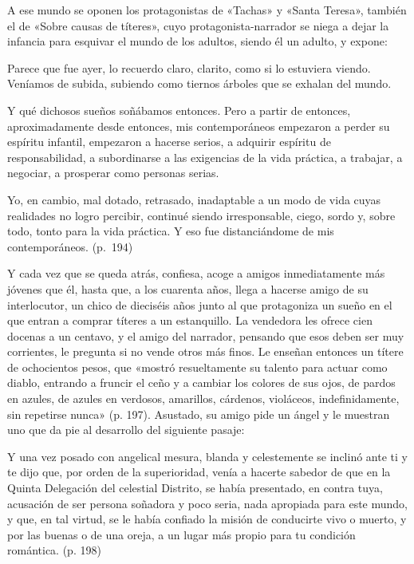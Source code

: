 \documentclass[14pt,twoside,final]{extbook} %
\begin{document}
A ese mundo se oponen los protagonistas de «Tachas» y «Santa Teresa», también el de «Sobre causas de títeres», cuyo protagonista-narrador se niega a dejar la infancia para esquivar el mundo de los adultos, siendo él un adulto, y expone:
\begin{quoting}
Parece que fue ayer, lo recuerdo claro, clarito, como si lo estuviera viendo. Veníamos de subida, subiendo como tiernos árboles que se exhalan del mundo.

Y qué dichosos sueños soñábamos entonces. Pero a partir de entonces, aproximadamente desde entonces, mis contemporáneos empezaron a perder su espíritu infantil, empezaron a hacerse serios, a adquirir espíritu de responsabilidad, a subordinarse a las exigencias de la vida práctica, a trabajar, a negociar, a prosperar como personas serias.

Yo, en cambio, mal dotado, retrasado, inadaptable a un modo de vida cuyas realidades no logro percibir, continué siendo irresponsable, ciego, sordo y, sobre todo, tonto para la vida práctica. Y eso fue distanciándome de mis contemporáneos. (p.~194)
\end{quoting}
Y cada vez que se queda atrás, confiesa, acoge a amigos inmediatamente más jóvenes que él, hasta que, a los cuarenta años, llega a hacerse amigo de su interlocutor, un chico de dieciséis años junto al que protagoniza un sueño en el que entran a comprar títeres a un estanquillo. La vendedora les ofrece cien docenas a un centavo, y el amigo del narrador, pensando que esos deben ser muy corrientes, le pregunta si no vende otros más finos. Le enseñan entonces un títere de ochocientos pesos, que «mostró resueltamente su talento para actuar como diablo, entrando a fruncir el ceño y a cambiar los colores de sus ojos, de pardos en azules, de azules en verdosos, amarillos, cárdenos, violáceos, indefinidamente, sin repetirse nunca» (p. 197). Asustado, su amigo pide un ángel y le muestran uno que da pie al desarrollo del siguiente pasaje:
\begin{quoting}
Y una vez posado con angelical mesura, blanda y celestemente se inclinó ante ti y te dijo que, por orden de la superioridad, venía a hacerte sabedor de que en la Quinta Delegación del celestial Distrito, se había presentado, en contra tuya, acusación de ser persona soñadora y poco seria, nada apropiada para este mundo, y que, en tal virtud, se le había confiado la misión de conducirte vivo o muerto, y por las buenas o de una oreja, a un lugar más propio para tu condición romántica. (p. 198)
\end{quoting}
\end{document}

